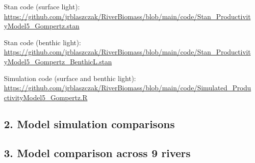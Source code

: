 \documentclass[]{article}
\begin{document}
Stan code (surface light):
\url{https://github.com/jrblaszczak/RiverBiomass/blob/main/code/Stan_ProductivityModel5_Gompertz.stan}

Stan code (benthic light):
\url{https://github.com/jrblaszczak/RiverBiomass/blob/main/code/Stan_ProductivityModel5_Gompertz_BenthicL.stan}

Simulation code (surface and benthic light):
\url{https://github.com/jrblaszczak/RiverBiomass/blob/main/code/Simulated_ProductivityModel5_Gompertz.R}

\subsection{2. Model simulation
comparisons}\label{model-simulation-comparisons}

\subsection{3. Model comparison across 9
rivers}\label{model-comparison-across-9-rivers}
\end{document}

